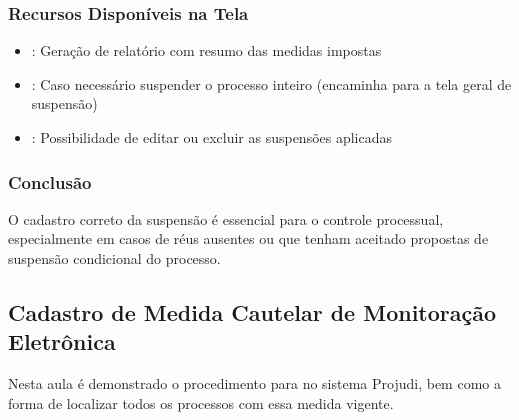 \documentclass[letterpaper,10pt,brazil]{sphinxmanual}
\begin{document}
\subsubsection{Recursos Disponíveis na Tela}
\label{\detokenize{projud_55_cadastrosuspensao:recursos-disponiveis-na-tela}}\begin{itemize}
\item {} 
\sphinxAtStartPar
{}: Geração de relatório com resumo das medidas impostas

\item {} 
\sphinxAtStartPar
{}: Caso necessário suspender o processo inteiro (encaminha para a tela geral de suspensão)

\item {} 
\sphinxAtStartPar
{}: Possibilidade de editar ou excluir as suspensões aplicadas

\end{itemize}


\subsubsection{Conclusão}
\label{\detokenize{projud_55_cadastrosuspensao:conclusao}}
\sphinxAtStartPar
O cadastro correto da suspensão  é essencial para o controle processual, especialmente em casos de réus ausentes ou que tenham aceitado propostas de suspensão condicional do processo.

\sphinxstepscope


\subsection{Cadastro de Medida Cautelar de Monitoração Eletrônica}
\label{\detokenize{projud_56_cadastromedidacautelar:cadastro-de-medida-cautelar-de-monitoracao-eletronica}}\label{\detokenize{projud_56_cadastromedidacautelar::doc}}
\sphinxAtStartPar
Nesta aula é demonstrado o procedimento para  no sistema Projudi, bem como a forma de localizar todos os processos com essa medida vigente.
\end{document}
